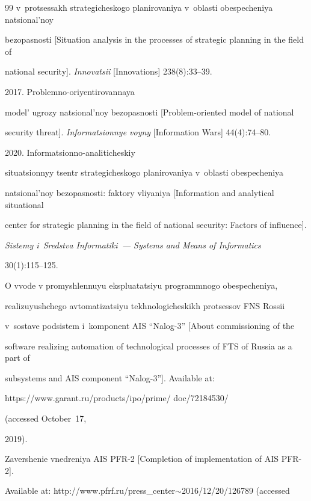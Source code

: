 {{\begin{thebibliography}{99}
v~protsessakh strategicheskogo planirovaniya v~ob\-lasti obespecheniya natsional'noy 


bezopasnosti [Situation analysis in the processes of strategic planning in the field of 


national security]. \textit{Innovatsii} [Innovations] 238(8):33--39. 




 2017. Problemno-oriyentirovannaya 


model' ugrozy natsional'noy bezopasnosti [Problem-oriented model of national 


security threat]. \textit{Informatsionnye voyny} [Information Wars] 44(4):74--80.




 2020. Informatsionno-analiticheskiy 


situatsionnyy tsentr strategicheskogo planirovaniya v~oblasti obespecheniya 


natsional'noy bezopasnosti: faktory vliyaniya [Information and analytical situational 


center for strategic planning in the field of national security: Factors of influence]. 


\textit{Sistemy i~Sredstva Informatiki~--- Systems and Means of Informatics}  


30(1):115--125.




O vvode v promyshlennuyu ekspluatatsiyu programmnogo obespecheniya, 


rea\-li\-zu\-yushche\-go avtomatizatsiyu tekhnologicheskikh protsessov FNS Rossii 


v~sostave podsistem i~komponent AIS ``Nalog-3'' [About commissioning of the 


software realizing automation of technological processes of FTS of Russia as a part of 


subsystems and AIS component ``Nalog-3'']. Available at: {\sf 


https://www.garant.ru/products/ipo/prime/ doc/72184530/} (accessed October~17, 


2019).




Zavershenie vnedreniya AIS PFR-2 [Completion of implementation of AIS PFR-2]. 


Available at: {\sf http://www.pfrf.ru/press\_center$\sim$2016/12/20/126789} (accessed 



\end{thebibliography}}}
